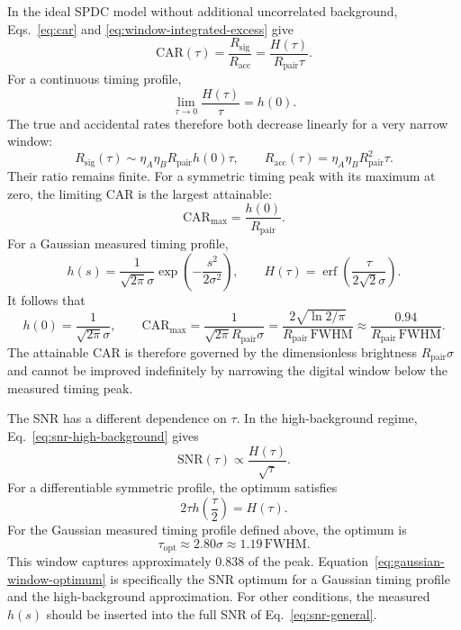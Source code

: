 \documentclass[a4paper,10pt]{article}
\begin{document}
In the ideal SPDC model without additional uncorrelated background,
Eqs.~\eqref{eq:car} and \eqref{eq:window-integrated-excess} give
\begin{equation}
    \label{eq:window-car}
    \mathrm{CAR}(\tau)
    =\frac{R_{\mathrm{sig}}}{R_{\mathrm{acc}}}
    =\frac{H(\tau)}{R_{\mathrm{pair}}\tau}.
\end{equation}
For a continuous timing profile,
\begin{equation}
    \lim_{\tau\to0}\frac{H(\tau)}{\tau}=h(0).
\end{equation}
The true and accidental rates therefore both decrease linearly for a very narrow window:
\begin{equation}
    R_{\mathrm{sig}}(\tau)
    \sim\eta_A\eta_B R_{\mathrm{pair}}h(0)\tau,
    \qquad
    R_{\mathrm{acc}}(\tau)
    =\eta_A\eta_B R_{\mathrm{pair}}^2\tau.
\end{equation}
Their ratio remains finite.  For a symmetric timing peak with its maximum at zero, the limiting CAR is the largest attainable:
\begin{equation}
    \mathrm{CAR}_{\max}
    =\frac{h(0)}{R_{\mathrm{pair}}}.
\end{equation}
For a Gaussian measured timing profile,
\begin{equation}
    h(s)=\frac{1}{\sqrt{2\pi}\sigma}
         \exp\!\left(-\frac{s^2}{2\sigma^2}\right),
    \qquad
    H(\tau)=\operatorname{erf}\!\left(
       \frac{\tau}{2\sqrt{2}\sigma}\right).
\end{equation}
It follows that
\begin{equation}
    h(0)=\frac{1}{\sqrt{2\pi}\sigma},
    \qquad
    \mathrm{CAR}_{\max}
    =\frac{1}{\sqrt{2\pi}R_{\mathrm{pair}}\sigma}
    =\frac{2\sqrt{\ln 2/\pi}}
           {R_{\mathrm{pair}}\,\mathrm{FWHM}}
    \approx\frac{0.94}
                  {R_{\mathrm{pair}}\,\mathrm{FWHM}}.
\end{equation}
The attainable CAR is therefore governed by the dimensionless brightness $R_{\mathrm{pair}}\sigma$ and cannot be improved indefinitely by narrowing the digital window below the measured timing peak.

The SNR has a different dependence on $\tau$.  In the high-background regime,
Eq.~\eqref{eq:snr-high-background} gives
\begin{equation}
    \mathrm{SNR}(\tau)\propto\frac{H(\tau)}{\sqrt{\tau}}.
\end{equation}
For a differentiable symmetric profile, the optimum satisfies
\begin{equation}
    2\tau h\!\left(\frac{\tau}{2}\right)=H(\tau).
\end{equation}
For the Gaussian measured timing profile defined above, the optimum is
\begin{equation}
    \label{eq:gaussian-window-optimum}
    \tau_{\mathrm{opt}}
    \approx2.80\sigma
    \approx1.19\,\mathrm{FWHM}.
\end{equation}
This window captures approximately $0.838$ of the peak.  Equation~\eqref{eq:gaussian-window-optimum} is specifically the SNR optimum for a Gaussian timing profile and the high-background approximation.  For other conditions, the measured $h(s)$ should be inserted into the full SNR of Eq.~\eqref{eq:snr-general}.
\end{document}
